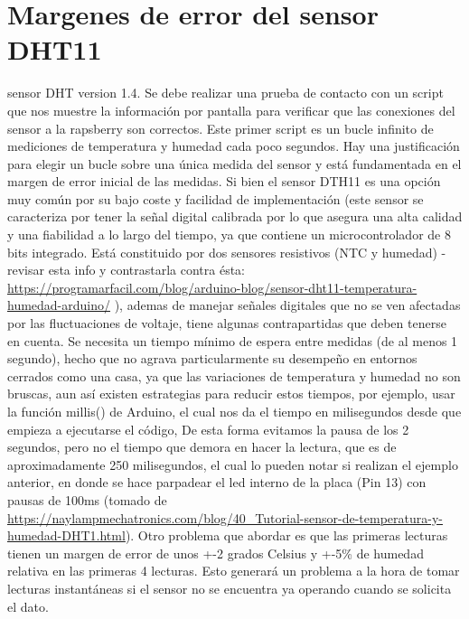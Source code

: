 \section{Margenes de error del sensor DHT11}
\label{AppendiB:key5}
sensor DHT version 1.4. Se debe realizar una prueba de contacto con un script que nos muestre la información por pantalla para verificar que las conexiones del sensor a la rapsberry son correctos. Este primer script es un bucle infinito de mediciones de temperatura y humedad cada poco segundos. Hay una justificación para elegir un bucle sobre una única medida del sensor y está fundamentada en el margen de error inicial de las medidas. Si bien el sensor DTH11 es una opción muy común por su bajo coste y facilidad de implementación (este sensor se caracteriza por tener la señal digital calibrada por lo que asegura una alta calidad y una fiabilidad a lo largo del tiempo, ya que contiene un microcontrolador de 8 bits integrado. Está constituido por dos sensores resistivos (NTC y humedad) - revisar esta info y contrastarla contra ésta: \url{https://programarfacil.com/blog/arduino-blog/sensor-dht11-temperatura-humedad-arduino/} ), ademas de manejar señales digitales que no se ven afectadas por las fluctuaciones de voltaje, tiene algunas contrapartidas que deben tenerse en cuenta. Se necesita un tiempo mínimo de espera entre medidas (de al menos 1 segundo), hecho que no agrava particularmente su desempeño en entornos cerrados como una casa, ya que las variaciones de temperatura y humedad no son bruscas, aun así existen estrategias para reducir estos tiempos, por ejemplo, usar la función millis() de Arduino, el cual nos da el tiempo en milisegundos desde que empieza a ejecutarse el código, De esta forma evitamos la pausa de los 2 segundos, pero no el tiempo que demora en hacer la lectura, que es de aproximadamente  250 milisegundos, el cual lo pueden notar si realizan el ejemplo anterior, en donde se hace parpadear el led interno de la placa (Pin 13) con pausas de 100ms (tomado de \url{https://naylampmechatronics.com/blog/40_Tutorial-sensor-de-temperatura-y-humedad-DHT1.html}). Otro problema que abordar es que las primeras lecturas tienen un margen de error de unos +-2 grados Celsius y +-5\% de humedad relativa en las primeras 4 lecturas. Esto generará un problema a la hora de tomar lecturas instantáneas si el sensor no se encuentra ya operando cuando se solicita el dato.
